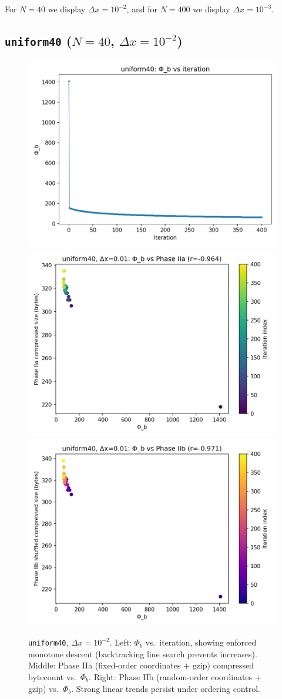 \documentclass[11pt,a4paper]{article}
\newcommand{\phib}{\Phi_b}
\begin{document}
For $N{=}40$ we display $\Delta x = 10^{-2}$, and for $N{=}400$ we display $\Delta x = 10^{-3}$.

\subsection*{\texttt{uniform40} ($N{=}40$, $\Delta x = 10^{-2}$)}
\begin{figure}[htbp]
\centering
\includegraphics[width=0.32\linewidth]{figures/uniform40_dx0.01_phib_vs_iter.png}
\includegraphics[width=0.32\linewidth]{figures/uniform40_dx0.01_phib_vs_phase2a.png}
\includegraphics[width=0.32\linewidth]{figures/uniform40_dx0.01_phib_vs_phase2b.png}
\caption{\texttt{uniform40}, $\Delta x{=}10^{-2}$. Left: $\phib$ vs.\ iteration, showing enforced monotone descent (backtracking line search prevents increases). Middle: Phase IIa (fixed-order coordinates $+$ gzip) compressed bytecount vs.\ $\phib$. Right: Phase IIb (random-order coordinates $+$ gzip) vs.\ $\phib$. Strong linear trends persist under ordering control.}
\label{fig:uniform40}
\end{figure}
\end{document}
